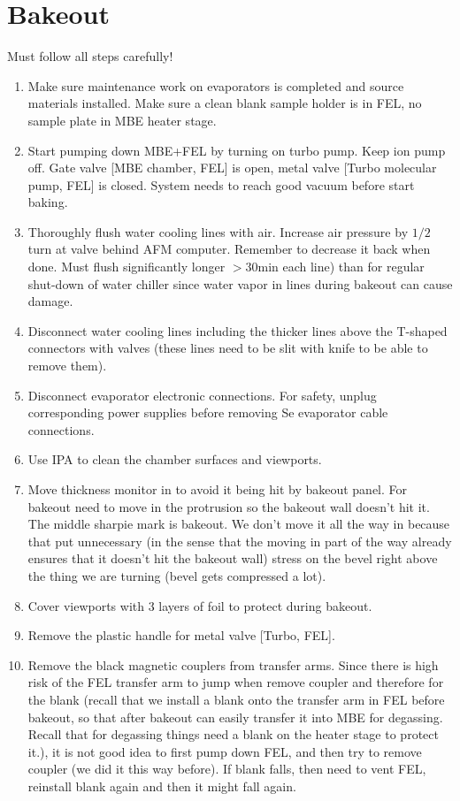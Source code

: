 \section{Bakeout}
Must follow all steps carefully!
\begin{enumerate}
\item Make sure maintenance work on evaporators is completed and source materials installed. Make sure a clean blank sample holder is in FEL, no sample plate in MBE heater stage.
\item	Start pumping down MBE+FEL by turning on turbo pump. Keep ion pump off. Gate valve [MBE chamber, FEL] is open, metal valve [Turbo molecular pump, FEL] is closed. System needs to reach good vacuum before start baking.
\item	Thoroughly flush water cooling lines with air. Increase air pressure by $1/2$ turn at valve behind AFM computer. Remember to decrease it back when done. Must flush significantly longer $>30$min each line) than for regular shut-down of water chiller since water vapor in lines during bakeout can cause damage.
\item	Disconnect water cooling lines including the thicker lines above the T-shaped connectors with valves (these lines need to be slit with knife to be able to remove them). 
\item	Disconnect evaporator electronic connections. For safety, unplug corresponding power supplies before removing Se evaporator cable connections. 
\item	Use IPA to clean the chamber surfaces and viewports.
\item	Move thickness monitor in to avoid it being hit by bakeout panel. For bakeout need to move in the protrusion so the bakeout wall doesn’t hit it. The middle sharpie mark is bakeout. We don’t move it all the way in because that put unnecessary (in the sense that the moving in part of the way already ensures that it doesn’t hit the bakeout wall) stress on the bevel right above the thing we are turning (bevel gets compressed a lot).
\item	Cover viewports with 3 layers of foil to protect during bakeout.
\item	Remove the plastic handle for metal valve [Turbo, FEL].
\item   Remove the black magnetic couplers from transfer arms. Since there is high risk of the FEL transfer arm to jump when remove coupler and therefore for the blank (recall that we install a blank onto the transfer arm in FEL before bakeout, so that after bakeout can easily transfer it into MBE for degassing. Recall that for degassing things need a blank on the heater stage to protect it.), it is not good idea to first pump down FEL, and then try to remove coupler (we did it this way before). If blank falls, then need to vent FEL, reinstall blank again and then it might fall again.\\

\end{enumerate}
